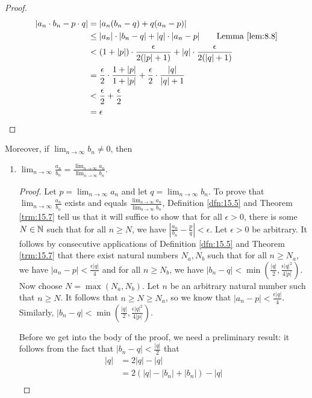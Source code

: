 \documentclass[../main.tex]{subfiles}
\begin{document}
\begin{theorem}
\begin{enumerate}[label={\textup{(}\alph*\textup{)}}]
\begin{proof}
            \begin{align*}
                |a_n\cdot b_n-p\cdot q| &= |a_n(b_n-q)+q(a_n-p)|\\
                &\leq |a_n|\cdot|b_n-q|+|q|\cdot|a_n-p|\tag*{Lemma \ref{lem:8.8}}\\
                &< (1+|p|)\cdot\frac{\epsilon}{2(|p|+1)}+|q|\cdot\frac{\epsilon}{2(|q|+1)}\\
                &= \frac{\epsilon}{2}\cdot\frac{1+|p|}{1+|p|}+\frac{\epsilon}{2}\cdot\frac{|q|}{|q|+1}\\
                &< \frac{\epsilon}{2}+\frac{\epsilon}{2}\\
                &= \epsilon
            \end{align*}
        \end{proof}
    \end{enumerate}
    Moreover, if $\lim_{n\to\infty}b_n\neq 0$, then
    \begin{enumerate}[resume,label={\textup{(}\alph*\textup{)}}]
        \item $\lim_{n\to\infty}\frac{a_n}{b_n}=\frac{\lim_{n\to\infty}a_n}{\lim_{n\to\infty}b_n}$.
        \begin{proof}
            Let $p=\lim_{n\to\infty}a_n$ and let $q=\lim_{n\to\infty}b_n$. To prove that $\lim_{n\to\infty}\frac{a_n}{b_n}$ exists and equals $\frac{\lim_{n\to\infty}a_n}{\lim_{n\to\infty}b_n}$, Definition \ref{dfn:15.5} and Theorem \ref{trm:15.7} tell us that it will suffice to show that for all $\epsilon>0$, there is some $N\in\mathbb{N}$ such that for all $n\geq N$, we have $|\frac{a_n}{b_n}-\frac{p}{q}|<\epsilon$. Let $\epsilon>0$ be arbitrary. It follows by consecutive applications of Definition \ref{dfn:15.5} and Theorem \ref{trm:15.7} that there exist natural numbers $N_a,N_b$ such that for all $n\geq N_a$, we have $|a_n-p|<\frac{\epsilon|q|}{4}$ and for all $n\geq N_b$, we have $|b_n-q|<\min(\frac{|q|}{2},\frac{\epsilon|q|^2}{4|p|})$. Now choose $N=\max(N_a,N_b)$. Let $n$ be an arbitrary natural number such that $n\geq N$. It follows that $n\geq N\geq N_a$, so we know that $|a_n-p|<\frac{\epsilon|q|}{4}$. Similarly, $|b_n-q|<\min(\frac{|q|}{2},\frac{\epsilon|q|^2}{4|p|})$.\par
            Before we get into the body of the proof, we need a preliminary result: it follows from the fact that $|b_n-q|<\frac{|q|}{2}$ that
            \begin{align*}
                |q| &= 2|q|-|q|\\
                &= 2(|q|-|b_n|+|b_n|)-|q|\\

\end{align*}
\end{proof}
\end{enumerate}
\end{theorem}
\end{document}
